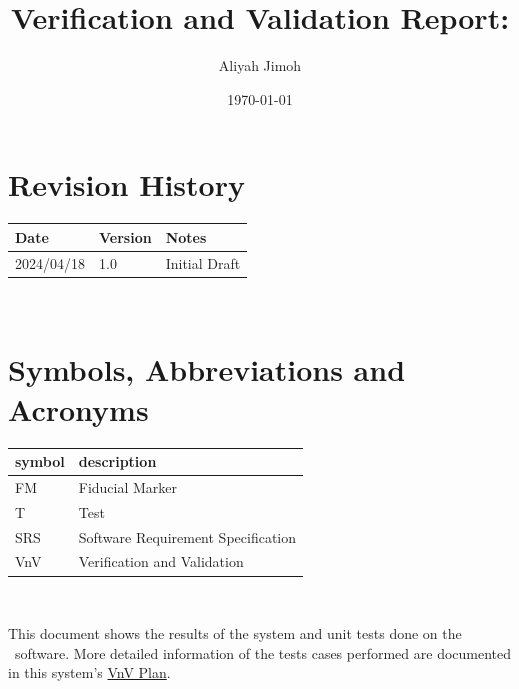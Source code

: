 \documentclass[12pt, titlepage]{article}
\begin{document}
\title{Verification and Validation Report: \progname} 
\author{Aliyah Jimoh}
\date{\today}
	
\maketitle


\section{Revision History}

\begin{tabularx}{\textwidth}{p{3cm}p{2cm}X}
\toprule {\bf Date} & {\bf Version} & {\bf Notes}\\
\midrule
2024/04/18 & 1.0 & Initial Draft\\
\bottomrule
\end{tabularx}

~\newpage

\section{Symbols, Abbreviations and Acronyms}

\renewcommand{\arraystretch}{1.2}
\begin{tabular}{l l} 
  \toprule		
  \textbf{symbol} & \textbf{description}\\
  \midrule 
  FM & Fiducial Marker\\
  T & Test\\
  SRS & Software Requirement Specification\\
  VnV & Verification and Validation\\
  \bottomrule
\end{tabular}\\

\newpage

\tableofcontents

\listoftables %

\listoffigures %

\newpage


This document shows the results of the system and unit tests done on the \progname~software. More detailed information of the tests cases performed are documented in this system's \href{https://github.com/AliyahJimoh/2D-Localizer/blob/main/docs/VnVPlan/VnVPlan.pdf}{VnV Plan}.
\end{document}

